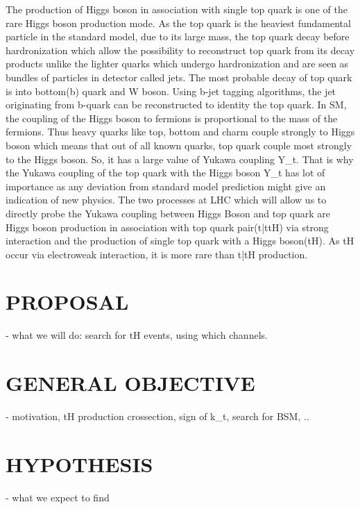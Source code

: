 \documentclass[final,3p]{CSP}
\begin{document}
The production of Higgs boson in association with single top quark is one of the rare Higgs boson production mode. As the top 
quark is the heaviest fundamental particle in the standard model, due to its large mass, the top quark decay before 
hardronization which allow the possibility to reconstruct top quark from its decay products unlike the lighter quarks which 
undergo hardronization and are seen as bundles of particles in detector called jets. The most probable decay of top quark is into 
bottom(b) quark and W boson. Using b-jet tagging algorithms, the jet originating from b-quark can be reconstructed to identity 
the top quark. In SM, the coupling of the Higgs boson to fermions is proportional to the mass of the fermions. Thus heavy quarks 
like top, bottom and charm couple strongly to Higgs boson which means that out of all known quarks, top quark couple most 
strongly to the Higgs boson. So, it has a large value of Yukawa coupling Y_t. That is why the Yukawa coupling of the top quark 
with the Higgs boson Y_t has lot of importance as any deviation from standard model prediction might give an indication of new 
physics. The two processes at LHC which will allow us to directly probe the Yukawa coupling between Higgs Boson and top 
quark are Higgs boson production in association with top quark pair(t\bar{t}tH) via strong interaction and the production 
of single top quark with a Higgs boson(tH). As tH occur via electroweak interaction, it is more rare than t\bar{t}H production.




\section{PROPOSAL}
- what we will do:  search for tH events, using which channels.

\section{GENERAL OBJECTIVE}
- motivation, tH production crossection, sign of k_t, search for BSM, ..


\section{HYPOTHESIS}
- what we expect to find
\end{document}
